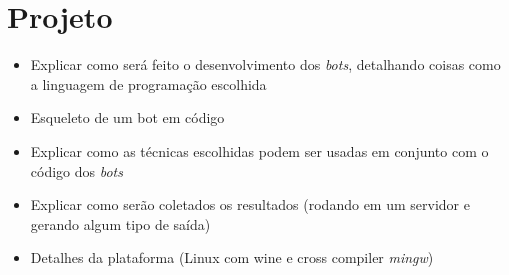 \chapter{\label{chap:project}Projeto}

\begin{mdframed}[backgroundcolor=green!20]
\begin{itemize}
    \item
        Explicar como será feito o desenvolvimento dos \textit{bots},
        detalhando coisas como a linguagem de programação escolhida
    \item
        Esqueleto de um bot em código
    \item
        Explicar como as técnicas escolhidas podem ser usadas em conjunto com o
        código dos \textit{bots}
    \item
        Explicar como serão coletados os resultados (rodando em um servidor e
        gerando algum tipo de saída)
    \item
        Detalhes da plataforma (Linux com wine e cross compiler \textit{mingw})
\end{itemize}
\end{mdframed}
